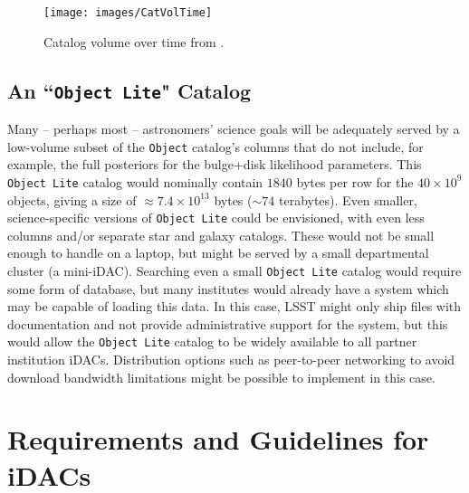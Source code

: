 \begin{figure}
\begin{center}
\texttt{[image: images/CatVolTime]}
\caption{Catalog volume over time from . \label{fig:catvol}}
\end{center}
\end{figure}

\subsection{An ``{\tt Object Lite}" Catalog}

Many -- perhaps most -- astronomers' science goals will be adequately served by a low-volume subset of the {\tt Object} catalog's columns that do not include, for example, the full posteriors for the bulge+disk likelihood parameters. This {\tt Object Lite} catalog would nominally contain $1840$ bytes per row for the $40 \times 10^{9}$ objects, giving a size of $\approx 7.4 \times 10^{13}$ bytes ($\sim74$ terabytes). Even smaller, science-specific versions of {\tt Object Lite} could be envisioned, with even less columns and/or separate star and galaxy catalogs. These would not be small enough to handle on a laptop, but might be served by a small departmental cluster (a mini-iDAC). Searching even a small {\tt Object Lite} catalog would require some form of database, but many institutes would already have a system which may be capable of loading this data. In this case, LSST might only ship files with documentation and not provide administrative support for the system, but this would allow the {\tt Object Lite} catalog to be widely available to all partner institution iDACs. Distribution options such as peer-to-peer networking to avoid download bandwidth limitations might be possible to implement in this case. 


\section{Requirements and Guidelines for iDACs}\label{sec:reqs}

